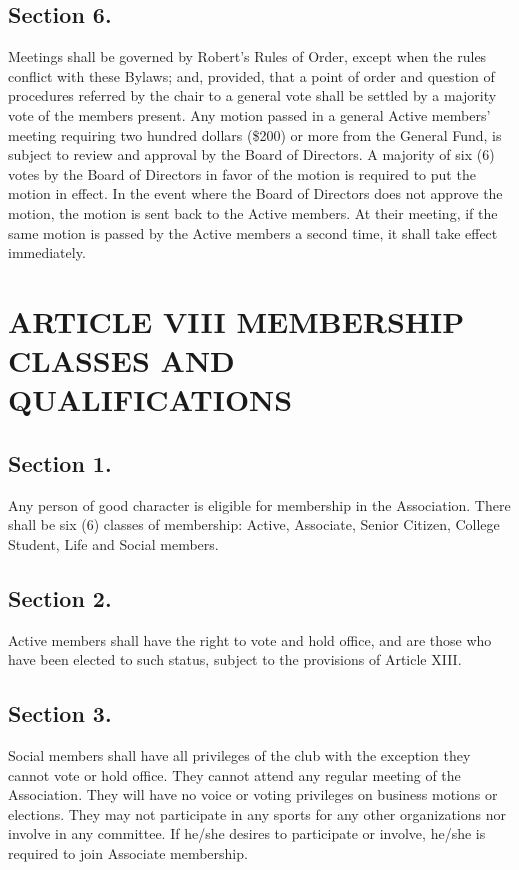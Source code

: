 \documentclass[12pt,letterpaper]{article}
\begin{document}
\subsection*{Section 6.} Meetings shall be governed by Robert’s Rules of Order, except when the
rules conflict with these Bylaws; and, provided, that a point of order and question of
procedures referred by the chair to a general vote shall be settled by a majority vote of
the members present. Any motion passed in a general Active members’ meeting
requiring two hundred dollars (\$200) or more from the General Fund, is subject to
review and approval by the Board of Directors. A majority of six (6) votes by the Board
of Directors in favor of the motion is required to put the motion in effect. In the event
where the Board of Directors does not approve the motion, the motion is sent back to
the Active members. At their meeting, if the same motion is passed by the Active
members a second time, it shall take effect immediately.

\section*{ARTICLE VIII
MEMBERSHIP CLASSES AND QUALIFICATIONS}

\subsection*{Section 1.} Any person of good character is eligible for membership in the Association.
There shall be six (6) classes of membership: Active, Associate, Senior Citizen, College
Student, Life and Social members.
\subsection*{Section 2.} Active members shall have the right to vote and hold office, and are those
who have been elected to such status, subject to the provisions of Article XIII.
\subsection*{Section 3.} Social members shall have all privileges of the club with the exception they
cannot vote or hold office. They cannot attend any regular meeting of the Association.
They will have no voice or voting privileges on business motions or elections. They may
not participate in any sports for any other organizations nor involve in any committee. If
he/she desires to participate or involve, he/she is required to join Associate
membership.
\end{document}

